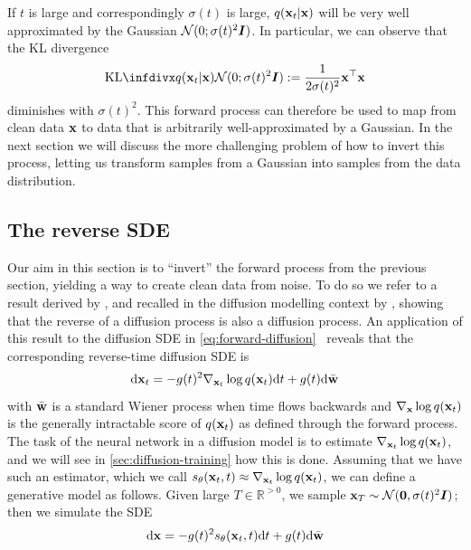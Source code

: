 If $t$ is large and correspondingly $\sigma(t)$ is large, $q({\mathbf{x}}_t|{\mathbf{x}})$ will be very well approximated by the Gaussian ${\mathcal{N}}(0; \sigma(t)^2{\bm{I}})$. In particular, we can observe that the KL divergence
\begin{equation}
    \kl{q(\rvx_t|\rvx)}{\gN(0; \sigma(t)^2\mI)} :=\frac{1}{2\sigma(t)^2} \rvx^\top \rvx
\end{equation}
diminishes with $\sigma(t)^2$. This forward process can therefore be used to map from clean data ${\mathbf{x}}$ to data that is arbitrarily well-approximated by a Gaussian. In the next section we will discuss the more challenging problem of how to invert this process, letting us transform samples from a Gaussian into samples from the data distribution.

\subsection{The reverse SDE} \label{sec:diffusion-reverse-sde}
Our aim in this section is to ``invert'' the forward process from the previous section, yielding a way to create clean data from noise. To do so we refer to a result  derived by \citet{anderson1982reverse}, and recalled in the diffusion modelling context by \citet{song2020score}, showing that the reverse of a diffusion process is also a diffusion process. An application of this result to the diffusion SDE in \cref{eq:forward-diffusion}~\citep{song2020score} reveals that the corresponding reverse-time diffusion SDE is
\begin{equation} \label{eq:reverse-diffusion}
    \mathrm{d}{\mathbf{x}}_t = -g(t)^2 \nabla_{{\mathbf{x}}_t} \log q({\mathbf{x}}_t) \mathrm{d}t + g(t) \mathrm{d}\bar{{\mathbf{w}}}
\end{equation}
with $\bar{{\mathbf{w}}}$ is a standard Wiener process when time flows backwards and $\nabla_{\mathbf{x}} \log q({\mathbf{x}}_t)$ is the generally intractable score of $q({\mathbf{x}}_t)$ as defined through the forward process. The task of the neural network in a diffusion model is to estimate $\nabla_{{\mathbf{x}}_t} \log q({\mathbf{x}}_t)$, and we will see in \cref{sec:diffusion-training} how this is done. Assuming that we have such an estimator, which we call $s_\theta({\mathbf{x}}_t, t) \approx \nabla_{{\mathbf{x}}_t} \log q({\mathbf{x}}_t)$, we can define a generative model as follows. Given large $T \in \mathbb{R}^{>0}$, we sample ${\mathbf{x}}_T \sim {\mathcal{N}}({\bm{0}}, \sigma(t)^2 {\bm{I}})$; then we simulate the SDE
\begin{equation} \label{eq:reverse-diffusion-with-nn}
    \mathrm{d}{\mathbf{x}} = -g(t)^2 s_\theta({\mathbf{x}}_t, t) \mathrm{d}t + g(t) \mathrm{d}\bar{{\mathbf{w}}}
\end{equation}
